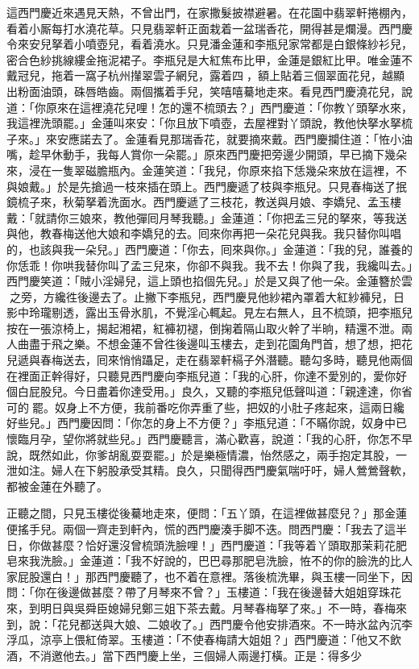這西門慶近來遇見天熱，不曾出門，在家撒髮披襟避暑。{}在花園中翡翠軒捲棚內，看着小厮每打水澆花草。只見翡翠軒正面栽着一盆瑞香花，開得甚是爛漫。西門慶令來安兒拏着小噴壺兒，看着澆水。只見潘金蓮和李瓶兒家常都是白銀條紗衫兒，密合色紗挑線縷金拖泥裙子。李瓶兒是大紅焦布比甲，金蓮是銀紅比甲。唯金蓮不戴冠兒，拖着一窩子杭州攆翠雲子網兒，露着四𩬆，額上貼着三個翠面花兒，越顯出粉面油頭，硃唇皓齒。兩個攜着手兒，笑嘻嘻驀地走來。看見西門慶澆花兒，說道：「你原來在這裡澆花兒哩！怎的還不梳頭去？」西門慶道：「你教丫頭拏水來，我這裡洗頭罷。」金蓮叫來安：「你且放下噴壺，去屋裡對丫頭說，教他快拏水拏梳子來。」來安應諾去了。金蓮看見那瑞香花，就要摘來戴。{}西門慶攔住道：「恠小油嘴，趁早休動手，我每人賞你一朵罷。」原來西門慶把旁邊少開頭，早已摘下幾朵來，浸在一隻翠磁膽瓶內。金蓮笑道：「我兒，你原來掐下恁幾朵來放在這裡，不與娘戴。」於是先搶過一枝來插在頭上。西門慶遞了枝與李瓶兒。只見春梅送了抿鏡梳子來，秋菊拏着洗面水。西門慶遞了三枝花，教送與月娘、李嬌兒、孟玉樓戴：「就請你三娘來，教他彈囘月琴我聽。」金蓮道：「你把孟三兒的拏來，等我送與他，教春梅送他大娘和李嬌兒的去。囘來你再把一朵花兒與我。我只替你叫唱的，也該與我一朵兒。」西門慶道：「你去，囘來與你。」金蓮道：「我的兒，誰養的你恁乖！你哄我替你叫了孟三兒來，你卻不與我。我不去！你與了我，我纔叫去。」西門慶笑道：「賊小淫婦兒，這上頭也掐個先兒。」於是又與了他一朵。金蓮簪於雲𩬆之旁，{}方纔徃後邊去了。止撇下李瓶兒，西門慶見他紗裙內罩着大紅紗褲兒，日影中玲瓏剔透，露出玉骨氷肌，不覺淫心輒起。見左右無人，且不梳頭，把李瓶兒按在一張涼椅上，揭起湘裙，紅褲初褪，倒掬着隔山取火幹了半晌，精還不泄。兩人曲盡于飛之樂。不想金蓮不曾徃後邊叫玉樓去，走到花園角門首，想了想，把花兒遞與春梅送去，囘來悄悄躡足，走在翡翠軒槅子外潛聽。{}聽勾多時，聽見他兩個在裡面正幹得好，只聽見西門慶向李瓶兒道：「我的心肝，你達不愛別的，愛你好個白屁股兒。今日盡着你達受用。」良久，又聽的李瓶兒低聲叫道：「親達達，你省可的𢵞罷。奴身上不方便，我前番吃你弄重了些，把奴的小肚子疼起來，這兩日纔好些兒。」西門慶因問：「你怎的身上不方便？」李瓶兒道：「不瞞你說，奴身中已懷臨月孕，{}望你將就些兒。」西門慶聽言，滿心歡喜，說道：「我的心肝，你怎不早說，既然如此，你爹胡亂耍耍罷。」於是樂極情濃，怡然感之，兩手抱定其股，一泄如注。婦人在下躬股承受其精。良久，只聞得西門慶氣喘吁吁，婦人鶯鶯聲軟，都被金蓮在外聽了。

正聽之間，只見玉樓從後驀地走來，便問：「五丫頭，在這裡做甚麼兒？」那金蓮便搖手兒。{}兩個一齊走到軒內，慌的西門慶湊手脚不迭。問西門慶：「我去了這半日，你做甚麼？恰好還沒曾梳頭洗臉哩！」西門慶道：「我等着丫頭取那茉莉花肥皂來我洗臉。」金蓮道：「我不好說的，巴巴尋那肥皂洗臉，恠不的你的臉洗的比人家屁股還白！」{}那西門慶聽了，也不着在意裡。落後梳洗畢，與玉樓一同坐下，因問：「你在後邊做甚麼？帶了月琴來不曾？」玉樓道：「我在後邊替大姐姐穿珠花來，到明日與吳舜臣媳婦兒鄭三姐下茶去戴。月琴春梅拏了來。」不一時，春梅來到，說：「花兒都送與大娘、二娘收了。」西門慶令他安排酒來。不一時氷盆內沉李浮瓜，涼亭上偎紅倚翠。玉樓道：「不使春梅請大姐姐？」西門慶道：「他又不飲酒，不消邀他去。」當下西門慶上坐，三個婦人兩邊打橫。正是：得多少

